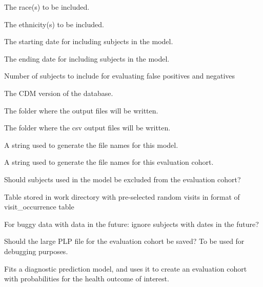\documentclass[a4paper]{book}
\begin{document}
\begin{Arguments}
\begin{ldescription}
\item[\code{race}] The race(s) to be included.

\item[\code{ethnicity}] The ethnicity(s) to be included.

\item[\code{startDate}] The starting date for including subjects in the model.

\item[\code{endDate}] The ending date for including subjects in the model.

\item[\code{falsePositiveNegativeSubjects}] Number of subjects to include for evaluating false positives and negatives

\item[\code{cdmVersion}] The CDM version of the database.

\item[\code{outFolder}] The folder where the output files will be written.

\item[\code{exportFolder}] The folder where the csv output files will be written.

\item[\code{modelId}] A string used to generate the file names for this model.

\item[\code{evaluationCohortId}] A string used to generate the file names for this evaluation cohort.

\item[\code{excludeModelFromEvaluation}] Should subjects used in the model be excluded from the evaluation cohort?

\item[\code{randomVisitTable}] Table stored in work directory with pre-selected random visits in format of visit\_occurrence table

\item[\code{removeSubjectsWithFutureDates}] For buggy data with data in the future: ignore subjects with
dates in the future?

\item[\code{saveEvaluationCohortPlpData}] Should the large PLP file for the evaluation cohort be saved? To be
used for debugging purposes.
\end{ldescription}
\end{Arguments}
%
\begin{Details}
Fits a diagnostic prediction model, and uses it to create an evaluation cohort with
probabilities for the health outcome of interest.
\end{Details}
\end{document}
